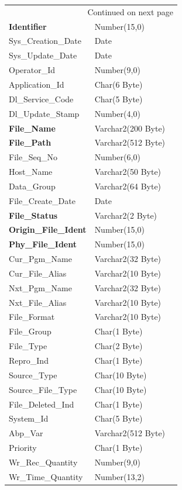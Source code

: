 \documentclass[12pt,twoside]{article}
\begin{document}
\begin{longtable}{l|l|l}
\hline
\endhead
\hline\multicolumn{3}{r}{Continued on next page} \\
\endfoot
\endlastfoot
\hline
\textbf{Identifier} & Number(15,0) & \\
Sys\_Creation\_Date & Date & \\
Sys\_Update\_Date & Date & \\
Operator\_Id & Number(9,0) & \\
Application\_Id & Char(6 Byte) & \\
Dl\_Service\_Code & Char(5 Byte) & \\
Dl\_Update\_Stamp & Number(4,0) & \\
\textbf{File\_Name} & Varchar2(200 Byte) & \\
\textbf{File\_Path} & Varchar2(512 Byte) & \\
File\_Seq\_No & Number(6,0) & \\
Host\_Name & Varchar2(50 Byte) & \\
Data\_Group & Varchar2(64 Byte) & \\
File\_Create\_Date & Date & \\
\textbf{File\_Status} & Varchar2(2 Byte) & \\
\textbf{Origin\_File\_Ident} & Number(15,0) & \\
\textbf{Phy\_File\_Ident} & Number(15,0) & \\
Cur\_Pgm\_Name & Varchar2(32 Byte) & \\
Cur\_File\_Alias & Varchar2(10 Byte) & \\
Nxt\_Pgm\_Name & Varchar2(32 Byte) & \\
Nxt\_File\_Alias & Varchar2(10 Byte) & \\
File\_Format & Varchar2(10 Byte) & \\
File\_Group & Char(1 Byte) & \\
File\_Type & Char(2 Byte) & \\
Repro\_Ind & Char(1 Byte) & \\
Source\_Type & Char(10 Byte) & \\
Source\_File\_Type & Char(10 Byte) & \\
File\_Deleted\_Ind & Char(1 Byte) & \\
System\_Id & Char(5 Byte) & \\
Abp\_Var & Varchar2(512 Byte) & \\
Priority & Char(1 Byte) & \\
Wr\_Rec\_Quantity & Number(9,0) & \\
Wr\_Time\_Quantity & Number(13,2) & \\

\end{longtable}
\end{document}
